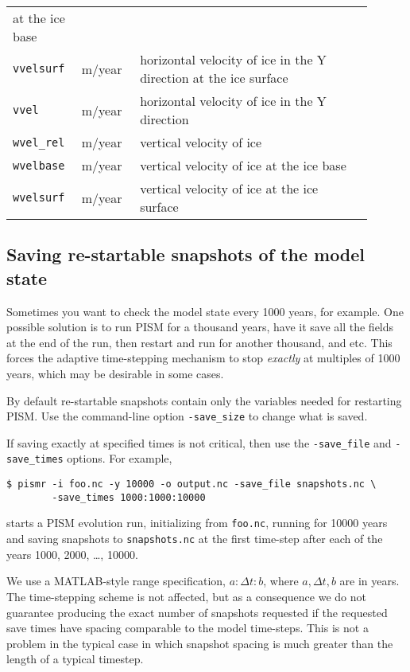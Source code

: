 \begin{center}
\begin{xtabular}{p{0.15\linewidth}p{0.15\linewidth}p{0.6\linewidth}}
    at the ice base\\
    \texttt{vvelsurf} & m/year & horizontal velocity of ice in the Y direction
    at the ice surface\\
   \texttt{vvel} & m/year & horizontal velocity of ice in the Y direction \\
    \texttt{wvel_rel} & m/year & vertical velocity of ice \\
    \texttt{wvelbase} & m/year &vertical velocity of ice at the ice base\\
    \texttt{wvelsurf} & m/year & vertical velocity of ice at the ice surface\\
  \end{xtabular}
\end{center}


\subsection{Saving re-startable snapshots of the model state}
\label{sec:snapshots}
Sometimes you want to check the model state every 1000 years, for example.  One possible solution is to run PISM for a thousand years, have it save all the fields at the end of the run, then restart and run for another thousand, and etc.  This forces the adaptive time-stepping mechanism to stop \emph{exactly} at multiples of 1000 years, which may be desirable in some cases.

By default re-startable snapshots contain only the variables needed for
restarting PISM. Use the command-line option \texttt{-save_size} to change what is saved.

If saving exactly at specified times is not critical, then use the \texttt{-save_file} and \texttt{-save_times} options.  For example,
\begin{verbatim}
$ pismr -i foo.nc -y 10000 -o output.nc -save_file snapshots.nc \
        -save_times 1000:1000:10000
\end{verbatim}
starts a PISM evolution run, initializing from \texttt{foo.nc}, running for
10000 years and saving snapshots to \texttt{snapshots.nc} at the first time-step
after each of the years 1000, 2000, \dots, 10000.

We use a MATLAB-style range specification, $a:\Delta t:b$, where $a,\Delta t,b$ are in years.  The time-stepping scheme is not affected, but as a consequence we do not guarantee producing the exact number of snapshots requested if the requested save times have spacing comparable to the model time-steps.  This is not a problem in the typical case in which snapshot spacing is much greater than the length of a typical timestep.

